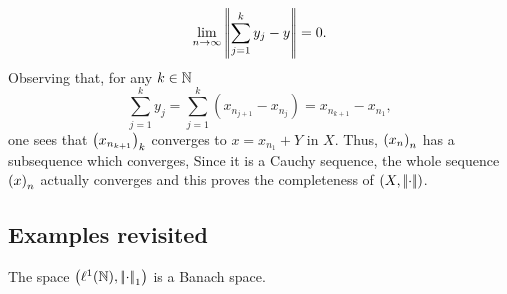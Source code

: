 \documentclass{article}
\begin{document}
\begin{fancyproof}
\begin{enumerate}
		\begin{equation*}
			\lim_{n\to\infty}\left|\negthinspace\left|\sum_{j=1}^{k}y_{j}-y\right|\negthinspace\right|=0.
		\end{equation*}
		Observing that, for any $k\in\mathbb{N}$
		\begin{equation*}
			\sum_{j=1}^{k}y_{j}=\sum_{j=1}^{k}\left(x_{n_{j+1}}-x_{n_{j}}\right)=x_{n_{k+1}}-x_{n_{1}},
		\end{equation*}
		one sees that ${\left(x_{n_{k+1}}\right)}_{k}$ converges to $x=x_{n_{1}}+Y$ in $X$. Thus, ${\left({x}_{n}\right)}_{n}$ has a subsequence which converges, Since it is a Cauchy sequence, the whole sequence ${\left(x\right)}_{n}$ actually converges and this proves the completeness of $\left(X,\left|\negthinspace\left|\cdot\right|\negthinspace\right|\right)$.
	\end{enumerate}
\end{fancyproof}\subsection{Examples revisited}
\begin{proposition}
	The space $\left(\ell^{1}(\mathbb{N}),\left|\negthinspace\left|\cdot\right|\negthinspace\right|_{1}\right)$ is a Banach space.
\end{proposition}
\end{document}

